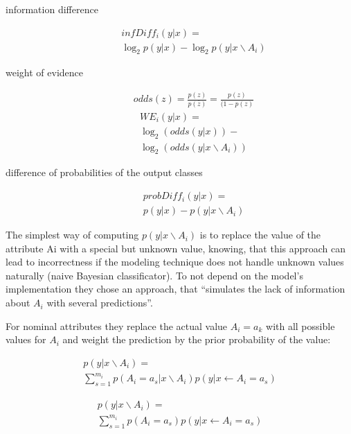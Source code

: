\begin{description}
    \item[information difference]
        \begin{multline}
              infDiff_{i}(y|x) = \\
              \log_{2} p(y|x)−\log_{2} p(y|x \backslash A_{i})
        \end{multline}
          
    \item[weight of evidence ]
        \begin{multline}
            odds(z) =\frac{p(z)}{p(\bar{z})} = \frac{p(z)}{(1 − p(z)}
        \end{multline}
        \begin{multline}
            WE_{i}(y|x) = \\
            \log_{2} (odds(y|x)) − \\
            \log_{2}(odds(y|x \backslash A_{i}))
        \end{multline}
       
    \item[difference of probabilities of the output classes]
        \begin{multline}
            probDiff_{i} (y|x) = \\
        p(y|x)− p(y|x \backslash A_{i})
        \end{multline}
\end{description}
\par
The simplest way of computing \(p(y|x \backslash A_{i})\) is to replace the value of the attribute Ai with a special but unknown value, knowing, that this approach can lead to incorrectness if the modeling technique does not handle unknown values naturally (naive Bayesian classificator).
To not depend on the model's implementation they chose an approach, that “simulates the lack of information about \(A_{i}\) with several predictions”\cite[p.4]{RobnikSikonja.2008}.
\par
For  nominal attributes they replace the actual value \(A_{i} = a_{k}\) with all possible values for \(A_{i}\) and weight the prediction by the prior probability of the value: 
\begin{description}

    \item 
        \begin{multline} 
            p(y|x \backslash A_{i}) = \\ 
            \sum_{s=1}^{m_{i}} p(A_{i} = a_{s} | x \backslash A_{i})p(y|x ← A_{i} = a_{s})
        \end{multline}
    \item 
        \begin{multline}
            p(y|x \backslash A_{i}) = \\ 
            \sum_{s=1}^{m_{i}} p(A_{i} = a_{s})p(y|x ← A_{i} = a_{s})
        \end{multline}
\end{description}

